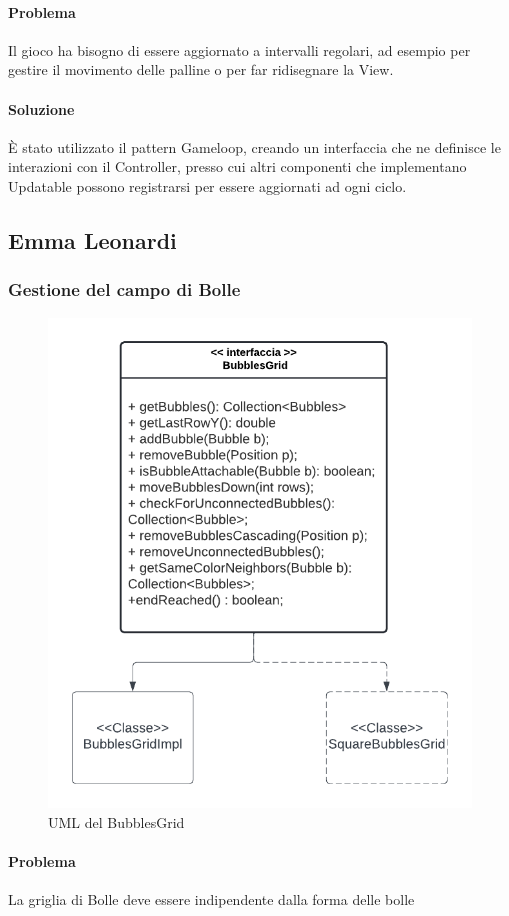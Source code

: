 \documentclass[a4paper,12pt]{report}
\begin{document}
\paragraph{Problema} Il gioco ha bisogno di essere aggiornato a intervalli regolari, ad esempio per gestire il movimento delle palline o per far ridisegnare la View.

\paragraph{Soluzione} È stato utilizzato il pattern Gameloop, creando un interfaccia che ne definisce le interazioni con il Controller, presso cui altri componenti che implementano Updatable possono registrarsi
per essere aggiornati ad ogni ciclo.

\subsection{Emma Leonardi}
\subsubsection{Gestione del campo di Bolle}

\begin{figure}[H]
	\centering{}
	\includegraphics[width=.7\textwidth]{img/bubble_grid.pdf}
	\caption{UML del BubblesGrid}
\end{figure}

\paragraph{Problema} La griglia di Bolle deve essere indipendente dalla forma delle bolle
\end{document}
